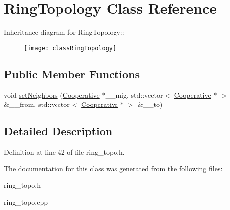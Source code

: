 \hypertarget{classRingTopology}{
\section{Ring\-Topology Class Reference}
\label{classRingTopology}
}
Inheritance diagram for Ring\-Topology::\begin{figure}[H]
\begin{center}
\leavevmode
\texttt{[image: classRingTopology]}
\end{center}
\end{figure}
\subsection*{Public Member Functions}
\begin{CompactItemize}
\item 
\hypertarget{classRingTopology_292a7746993788f96042f2f628cfcbc5}{
void \hyperlink{classRingTopology_292a7746993788f96042f2f628cfcbc5}{set\-Neighbors} (\hyperlink{classCooperative}{Cooperative} $\ast$\_\-\_\-mig, std::vector$<$ \hyperlink{classCooperative}{Cooperative} $\ast$ $>$ \&\_\-\_\-from, std::vector$<$ \hyperlink{classCooperative}{Cooperative} $\ast$ $>$ \&\_\-\_\-to)}
\label{classRingTopology_292a7746993788f96042f2f628cfcbc5}

\end{CompactItemize}


\subsection{Detailed Description}




Definition at line 42 of file ring\_\-topo.h.

The documentation for this class was generated from the following files:\begin{CompactItemize}
\item 
ring\_\-topo.h\item 
ring\_\-topo.cpp\end{CompactItemize}
